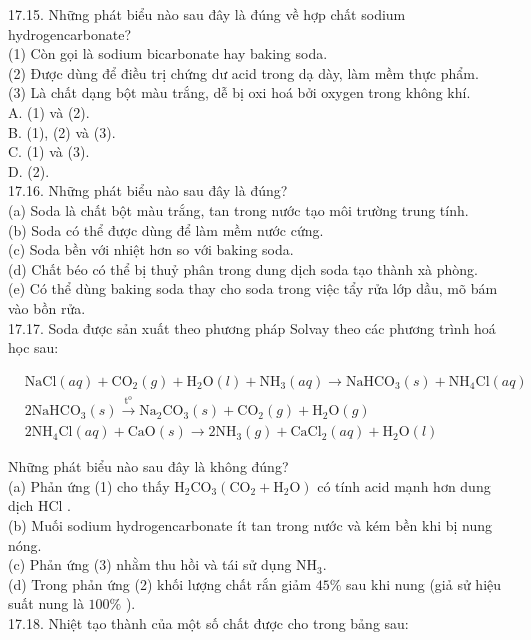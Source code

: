 \documentclass[10pt]{article}
\begin{document}
17.15. Những phát biểu nào sau đây là đúng về hợp chất sodium hydrogencarbonate?\\
(1) Còn gọi là sodium bicarbonate hay baking soda.\\
(2) Được dùng để điều trị chứng dư acid trong dạ dày, làm mềm thực phẩm.\\
(3) Là chất dạng bột màu trắng, dễ bị oxi hoá bởi oxygen trong không khí.\\
A. (1) và (2).\\
B. (1), (2) và (3).\\
C. (1) và (3).\\
D. (2).\\
17.16. Những phát biểu nào sau đây là đúng?\\
(a) Soda là chất bột màu trắng, tan trong nước tạo môi trường trung tính.\\
(b) Soda có thể được dùng để làm mềm nước cứng.\\
(c) Soda bền với nhiệt hơn so với baking soda.\\
(d) Chất béo có thể bị thuỷ phân trong dung dịch soda tạo thành xà phòng.\\
(e) Có thể dùng baking soda thay cho soda trong việc tẩy rửa lớp dầu, mõ bám vào bồn rửa.\\
17.17. Soda được sản xuất theo phương pháp Solvay theo các phương trình hoá học sau:


\begin{align*}
& \mathrm{NaCl}(a q)+\mathrm{CO}_{2}(g)+\mathrm{H}_{2} \mathrm{O}(l)+\mathrm{NH}_{3}(a q) \rightarrow \mathrm{NaHCO}_{3}(s)+\mathrm{NH}_{4} \mathrm{Cl}(a q)  \tag{1}\\
& 2 \mathrm{NaHCO}_{3}(s) \xrightarrow{\mathrm{t}^{\mathrm{o}}} \mathrm{Na}_{2} \mathrm{CO}_{3}(s)+\mathrm{CO}_{2}(g)+\mathrm{H}_{2} \mathrm{O}(g)  \tag{2}\\
& 2 \mathrm{NH}_{4} \mathrm{Cl}(a q)+\mathrm{CaO}(s) \rightarrow 2 \mathrm{NH}_{3}(g)+\mathrm{CaCl}_{2}(a q)+\mathrm{H}_{2} \mathrm{O}(l) \tag{3}
\end{align*}


Những phát biểu nào sau đây là không đúng?\\
(a) Phản ứng (1) cho thấy $\mathrm{H}_{2} \mathrm{CO}_{3}\left(\mathrm{CO}_{2}+\mathrm{H}_{2} \mathrm{O}\right)$ có tính acid mạnh hơn dung dịch HCl .\\
(b) Muối sodium hydrogencarbonate ít tan trong nước và kém bền khi bị nung nóng.\\
(c) Phản ứng (3) nhằm thu hồi và tái sử dụng $\mathrm{NH}_{3}$.\\
(d) Trong phản ứng (2) khối lượng chất rắn giảm $45 \%$ sau khi nung (giả sử hiệu suất nung là $100 \%$ ).\\
17.18. Nhiệt tạo thành của một số chất được cho trong bảng sau:
\end{document}
